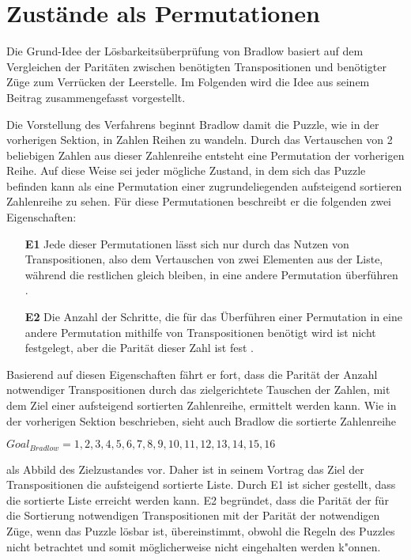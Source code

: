 
\section{Zustände als Permutationen} %
\label{sec:Permutation}
Die Grund-Idee der Lösbarkeitsüberprüfung von Bradlow basiert auf dem Vergleichen der Paritäten zwischen benötigten Transpositionen und benötigter Züge zum Verrücken der Leerstelle. Im Folgenden wird die Idee aus seinem Beitrag \autocite{Unsolvable-14-15-Numberphile-YT:online} zusammengefasst vorgestellt.\WNL

Die Vorstellung des Verfahrens beginnt Bradlow damit die Puzzle, wie in der vorherigen Sektion, in Zahlen Reihen zu wandeln. Durch das Vertauschen von 2 beliebigen Zahlen aus dieser Zahlenreihe entsteht eine Permutation der vorherigen Reihe. Auf diese Weise sei jeder mögliche Zustand, in dem sich das Puzzle befinden kann als eine Permutation einer zugrundeliegenden aufsteigend sortieren Zahlenreihe zu sehen. Für diese Permutationen beschreibt er die folgenden zwei Eigenschaften:
\begin{enumerate}
	\item[\textbf{E1}] Jede dieser Permutationen lässt sich nur durch das Nutzen von Transpositionen, also dem Vertauschen von zwei Elementen aus der Liste, während die restlichen gleich bleiben, in eine andere Permutation überführen \cite[Vgl.][7min,07sec]{Unsolvable-14-15-Numberphile-YT:online}.
	\item[\textbf{E2}] Die Anzahl der Schritte, die für das Überführen einer Permutation in eine andere Permutation mithilfe von Transpositionen benötigt wird ist nicht festgelegt, aber die Parität dieser Zahl ist fest \cite[Vgl.][10min,13sec]{Unsolvable-14-15-Numberphile-YT:online}.
\end{enumerate}
Basierend auf diesen Eigenschaften fährt er fort, dass die Parität der Anzahl notwendiger Transpositionen durch das zielgerichtete Tauschen der Zahlen, mit dem Ziel einer aufsteigend sortierten Zahlenreihe, ermittelt werden kann. Wie in der vorherigen Sektion beschrieben, sieht auch Bradlow die sortierte Zahlenreihe
\begin{center}
	$Goal_{Bradlow} = {1,2,3,4,5,6,7,8,9,10,11,12,13,14,15,16}$
\end{center}
als Abbild des Zielzustandes vor. Daher ist in seinem Vortrag das Ziel der Transpositionen die aufsteigend sortierte Liste. Durch E1 ist sicher gestellt, dass die sortierte Liste erreicht werden kann. E2 begründet, dass die Parität der für die Sortierung notwendigen Transpositionen mit der Parität der notwendigen Züge, wenn das Puzzle lösbar ist, übereinstimmt, obwohl die Regeln des Puzzles nicht betrachtet und somit möglicherweise nicht eingehalten werden k"onnen.\WNL
